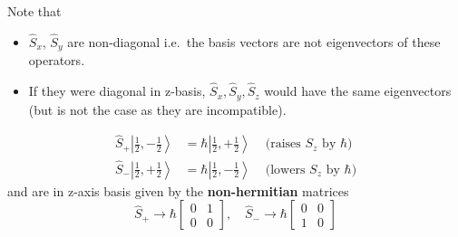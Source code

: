 Note that
\begin{itemize}
    \item $\widehat{S}_{x}$, $\widehat{S}_{y}$ are non-diagonal i.e.\ the basis vectors are not eigenvectors of these operators.
    \item If they were diagonal in z-basis, $\widehat{S}_{x},\widehat{S}_{y},\widehat{S}_{z}$ would have the same eigenvectors (but is not the case as they are incompatible).
\end{itemize}

\newpar{}
\begin{align*}
    \widehat{S}_{+}\left|\frac{1}{2},-\frac{1}{2}\right> & =\hbar\left|\frac{1}{2},+\frac{1}{2}\right> & \text{ (raises $S_z$ by $\hbar$)} \\
    \widehat{S}_{-}\left|\frac{1}{2},+\frac{1}{2}\right> & =\hbar\left|\frac{1}{2},-\frac{1}{2}\right> & \text{ (lowers $S_z$ by $\hbar$)}
\end{align*}
and are in z-axis basis given by the \textbf{non-hermitian} matrices
\begin{equation*}
    \widehat{S}_{+}  \rightarrow \hbar\begin{bmatrix}
        0 & 1 \\
        0 & 0
    \end{bmatrix},\quad
    \widehat{S}_{-}  \rightarrow \hbar\begin{bmatrix}
        0 & 0 \\
        1 & 0
    \end{bmatrix}
\end{equation*}